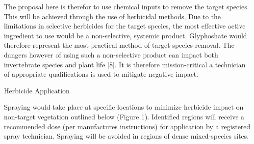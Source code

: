 The proposal here is therefor to use chemical inputs to remove the target species. This will be achieved through the use of herbicidal methods. Due to the limitations in selective herbicides for the target species, the most effective active ingredient to use would be a non-selective, systemic product. Glyphoshate would therefore represent the most practical method of target-species removal. The dangers however of using such a non-selective product can impact both invertebrate species and plant life [8]. It is therefore mission-critical a technician of appropriate qualifications is used to mitigate negative impact.


\newpage

\begin{center}

\Large{Herbicide Application}

\end{center}


Spraying would take place at specific locations to minimize herbicide impact on non-target vegetation outlined below (Figure 1). Identified regions will receive a recommended dose (per manufactures instructions) for application by a registered spray technician. Spraying will be avoided in regions of dense mixed-species sites.


